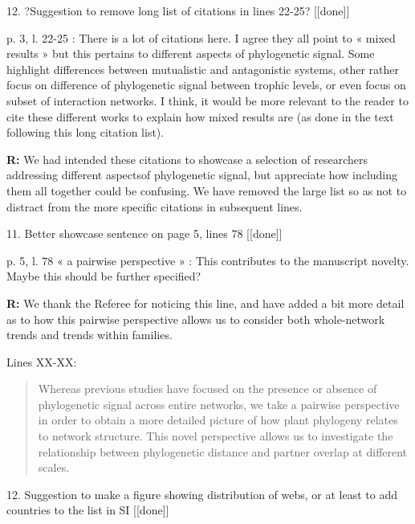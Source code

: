 \documentclass[12pt]{letter}
\newenvironment{refquote}{\bigskip \begin{it}}{\end{it}\smallskip}
\begin{document}
	12. ?Suggestion to remove long list of citations in lines 22-25? [[done]]

		\begin{refquote}
			p. 3, l. 22-25 : There is a lot of citations here. I agree they all point to « mixed results » but this pertains to different aspects of phylogenetic signal. Some highlight differences between mutualistic and antagonistic systems, other rather focus on difference of phylogenetic signal between trophic levels, or even focus on subset of interaction networks. I think, it would be more relevant to the reader to cite these different works to explain how mixed results are (as done in the text following this long citation list).
		\end{refquote}


		\textbf{R:} We had intended these citations to showcase a selection of researchers addressing different aspectsof phylogenetic signal, but appreciate how including them all together could be confusing. We have removed the large list so as not to distract from the more specific citations in subsequent lines.


	11. Better showcase sentence on page 5, lines 78 [[done]]

		\begin{refquote}
			p. 5, l. 78 « a pairwise perspective » : This contributes to the manuscript novelty. Maybe this should be further specified?
		\end{refquote}

		\textbf{R:} We thank the Referee for noticing this line, and have added a bit more detail as to how this pairwise perspective allows us to consider both whole-network trends and trends within families.


		Lines XX-XX:

		\begin{quotation}

			Whereas previous 
		  studies have focused on the presence or absence of phylogenetic
		  signal across entire networks, we take a pairwise perspective in
		  order to obtain a more detailed picture of how plant phylogeny
		  relates to network structure. This novel perspective allows us to investigate the relationship between phylogenetic distance and partner overlap at different scales. 

		\end{quotation}


	12. Suggestion to make a figure showing distribution of webs, or at least to add countries to the list in SI [[done]]
\end{document}
